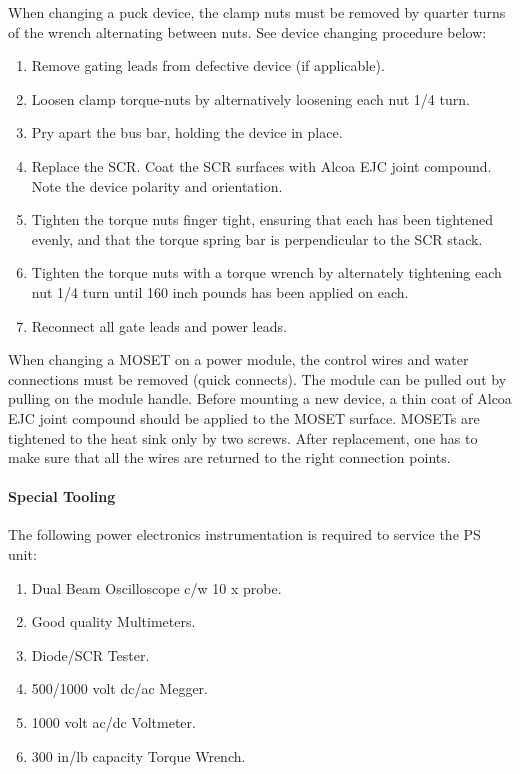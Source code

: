 When changing a puck device, the clamp nuts must be removed by
quarter turns of the wrench alternating between nuts.  See device
changing procedure below:

\begin{enumerate}
\item Remove gating leads from defective device (if applicable).
\item Loosen clamp torque-nuts by alternatively loosening each nut
1/4 turn.
\item Pry apart the bus bar, holding the device in place.
\item Replace the SCR.  Coat the SCR surfaces with Alcoa EJC joint
compound. Note the device polarity and orientation.
\item Tighten the torque nuts finger tight, ensuring that each has
been tightened evenly, and that the torque spring bar is perpendicular
to the SCR stack.
\item Tighten the torque nuts with a torque wrench by alternately
tightening each nut 1/4 turn until 160 inch pounds has been applied on
each.
\item Reconnect all gate leads and power leads.
\end{enumerate}

When changing a MOSET on a power module, the control wires and
water connections must be removed (quick connects).  The module can be
pulled out by pulling on the module handle.  Before mounting a new
device, a thin coat of Alcoa EJC joint compound should be applied to the
MOSET surface.  MOSETs are tightened to the heat sink only by two
screws.  After replacement, one has to make sure that all the wires are
returned to the right connection points.


\paragraph{Special Tooling}

The following power electronics instrumentation is required to
service the PS unit:

\begin{enumerate}
\item Dual Beam Oscilloscope c/w 10 x probe.
\item Good quality Multimeters.
\item Diode/SCR Tester.
\item 500/1000 volt dc/ac Megger.
\item 1000 volt ac/dc Voltmeter.
\item 300 in/lb capacity Torque Wrench.
\end{enumerate}

